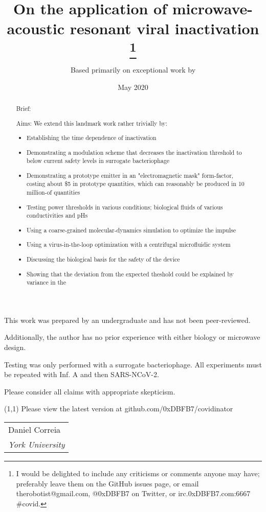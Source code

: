 \documentclass[fleqn,10pt]{article}
\title{On the application of microwave-acoustic resonant viral inactivation
\thanks{I would be delighted to include any criticisms or comments anyone may have; preferably leave them on the GitHub issues page, or email therobotist@gmail.com, @0xDBFB7 on Twitter, or irc.0xDBFB7.com:6667 \#covid.}}
\date{May 2020}
\author{Based primarily on exceptional work by }
\begin{document}
\flushbottom 
\maketitle
\thispagestyle{empty}


This work was prepared by an undergraduate and has not been peer-reviewed. 

Additionally, the author has no prior experience with either biology or microwave design. 

Testing was only performed with a surrogate bacteriophage. All experiments must be repeated with Inf. A and then SARS-NCoV-2.

Please consider all claims with appropriate skepticism.

\begin{textblock}{5}(1,1)
\noindent Please view the latest version at github.com/0xDBFB7/covidinator
\end{textblock}

\null\begin{tabular}[t]{l@{}}
  {Daniel Correia} \\
  \textit{York University}
\end{tabular}



\begin{abstract}

Brief: 

Aims:
We extend this landmark work rather trivially by:
\begin{itemize}
  \item Establishing the time dependence of inactivation
  \item Demonstrating a modulation scheme that decreases the inactivation threshold to below current safety levels in surrogate bacteriophage
  \item Demonstrating a prototype emitter in an "electromagnetic mask" form-factor, costing about \$5 in prototype quantities, which can reasonably be produced in 10 million-of quantities
  \item Testing power thresholds in various conditions; biological fluids of various conductivities and pHs
  \item Using a coarse-grained molecular-dynamics simulation to optimize the impulse
  \item Using a virus-in-the-loop optimization with a centrifugal microfluidic system
  \item Discussing the biological basis for the safety of the device
  \item Showing that the deviation from the expected theshold could be explained by variance in the 
\end{itemize}
\end{abstract}
\end{document}
